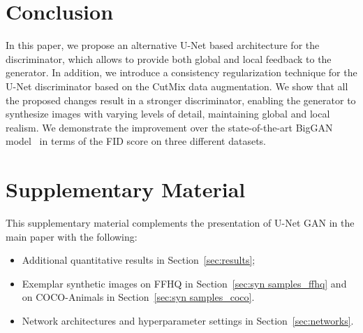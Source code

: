 \documentclass[10pt,twocolumn,letterpaper]{article}
\newcommand{\beginsupplement}{\setcounter{table}{0}
	\renewcommand{\thetable}{S\arabic{table}}\setcounter{figure}{0}
	\renewcommand{\thefigure}{S\arabic{figure}}\setcounter{section}{0}
	\renewcommand{\thesection}{S\arabic{section}}  
	\setcounter{equation}{0}
	\renewcommand{\theequation}{S\arabic{equation}}
}
\begin{document}
 
\section{Conclusion}
In this paper, we propose an alternative U-Net based architecture for the discriminator, which allows to provide both global and local feedback to the generator. In addition, we introduce a consistency regularization technique for the U-Net discriminator based on the CutMix data augmentation. We show that all the proposed changes result in a stronger discriminator, enabling the generator to synthesize images with varying levels of detail, maintaining global and local realism. We demonstrate the improvement over the state-of-the-art BigGAN model~\cite{Brock2019} in terms of the FID score on three different datasets.

 
{\small


}

\clearpage
\renewcommand{\thesubsection}{\Alph{subsection}}


\beginsupplement

\newpage
\section*{\Large Supplementary Material}
\label{content}

This supplementary material complements the presentation of U-Net GAN in the main paper with the following:

\begin{itemize}
\item Additional quantitative results in Section~\ref{sec:results};
\item Exemplar synthetic images on FFHQ in Section~\ref{sec:syn samples_ffhq} and on COCO-Animals in Section~\ref{sec:syn samples_coco}.
\item Network architectures and hyperparameter settings in Section~\ref{sec:networks}.	
\end{itemize}	
\end{document}
